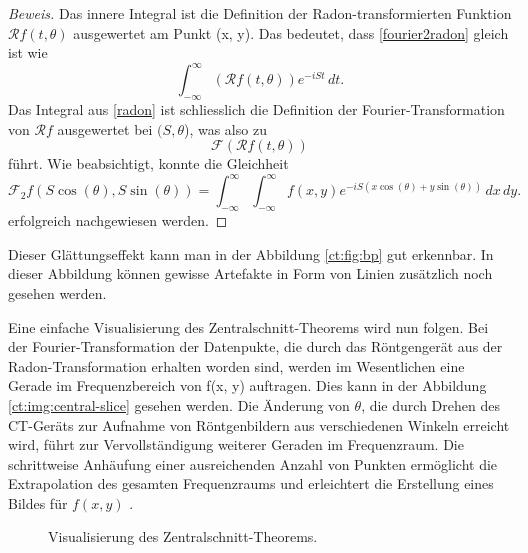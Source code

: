 \begin{proof}[Beweis]
	Das innere Integral ist die Definition der Radon-transformierten Funktion $\mathscr{R}f(t, \theta)$ ausgewertet am Punkt (x, y). Das bedeutet, dass \eqref{fourier2radon} gleich ist wie
	\begin{equation}\label{radon}
		\int_{-\infty}^{\infty} (\mathscr{R}f(t, \theta)) e^{-iSt}\,dt.
	\end{equation}
	Das Integral aus \eqref{radon} ist schliesslich die Definition der Fourier-Transformation von $\mathscr{R}f$ ausgewertet bei $(S, \theta$), was also zu
	\begin{equation}\label{fourier1radon}
		\mathscr{F}(\mathscr{R}f(t, \theta))
	\end{equation}
	führt. Wie beabsichtigt, konnte die Gleichheit 
	\begin{equation}
		\mathscr{F}_2f(S\cos(\theta), S\sin(\theta)) = \int_{-\infty}^{\infty}\int_{-\infty}^{\infty} f(x, y)e^{-iS(x\cos(\theta)+y\sin(\theta))}\,dx\,dy.
	\end{equation}
	erfolgreich nachgewiesen werden.
\end{proof}

Dieser Glättungseffekt kann man in der Abbildung \ref{ct:fig:bp} gut erkennbar. In dieser Abbildung können gewisse Artefakte in Form von Linien zusätzlich noch gesehen werden.

Eine einfache Visualisierung des Zentralschnitt-Theorems wird nun folgen. Bei der Fourier-Transformation der Datenpukte, die durch das Röntgengerät aus der Radon-Transformation erhalten worden sind, werden im Wesentlichen eine Gerade im Frequenzbereich von f(x, y) auftragen. Dies kann in der Abbildung \ref{ct:img:central-slice} gesehen werden. 
Die Änderung von $\theta$, die durch Drehen des CT-Geräts zur Aufnahme von Röntgenbildern aus verschiedenen Winkeln erreicht wird, führt zur Vervollständigung weiterer Geraden im Frequenzraum. Die schrittweise Anhäufung einer ausreichenden Anzahl von Punkten ermöglicht die Extrapolation des gesamten Frequenzraums und erleichtert die Erstellung eines Bildes für $f(x, y)$ \cite{ct:condensate}.
\begin{figure}
	\centering
	\caption{Visualisierung des Zentralschnitt-Theorems.}
\end{figure}


